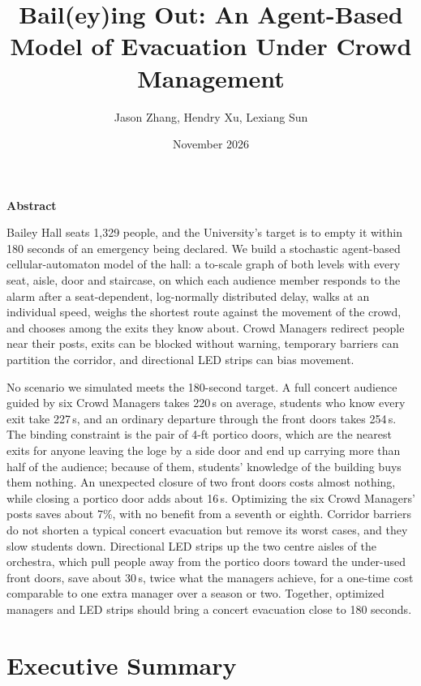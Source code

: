 \documentclass{article}
\title{Bail(ey)ing Out: An Agent-Based Model of Evacuation Under Crowd Management}
\author{Jason Zhang, Hendry Xu, Lexiang Sun}
\date{November 2026}
\begin{document}
\maketitle
\begin{center}
\textbf{Abstract}
\end{center}

Bailey Hall seats 1,329 people, and the University's target is to empty it within 180 seconds of an emergency being declared. We build a stochastic agent-based cellular-automaton model of the hall: a to-scale graph of both levels with every seat, aisle, door and staircase, on which each audience member responds to the alarm after a seat-dependent, log-normally distributed delay, walks at an individual speed, weighs the shortest route against the movement of the crowd, and chooses among the exits they know about. Crowd Managers redirect people near their posts, exits can be blocked without warning, temporary barriers can partition the corridor, and directional LED strips can bias movement.

No scenario we simulated meets the 180-second target. A full concert audience guided by six Crowd Managers takes 220\,s on average, students who know every exit take 227\,s, and an ordinary departure through the front doors takes 254\,s. The binding constraint is the pair of 4-ft portico doors, which are the nearest exits for anyone leaving the loge by a side door and end up carrying more than half of the audience; because of them, students' knowledge of the building buys them nothing. An unexpected closure of two front doors costs almost nothing, while closing a portico door adds about 16\,s. Optimizing the six Crowd Managers' posts saves about 7\%, with no benefit from a seventh or eighth. Corridor barriers do not shorten a typical concert evacuation but remove its worst cases, and they slow students down. Directional LED strips up the two centre aisles of the orchestra, which pull people away from the portico doors toward the under-used front doors, save about 30\,s, twice what the managers achieve, for a one-time cost comparable to one extra manager over a season or two. Together, optimized managers and LED strips should bring a concert evacuation close to 180 seconds.

\newpage
\section*{Executive Summary}
\end{document}
